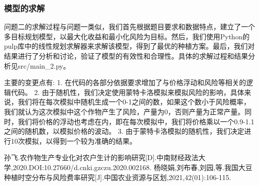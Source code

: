 \documentclass{cumcmthesis}
\begin{document}
\subsubsection{模型的求解}
问题二的求解过程与问题一类似，我们首先根据题目要求和数据特点，建立了一个多目标规划模型，以最大化收益和最小化风险为目标。然后，我们使用Python的pulp库中的线性规划求解器来求解该模型，得到了最优的种植方案。最后，我们对结果进行了分析和讨论，验证了模型的有效性和合理性。具体的求解过程和结果分析见src/main\_2.py。

主要的变更点有:
1. 在代码的各部分依据要求增加了与价格浮动和风险等相关的逻辑代码。
2. 由于随机性，我们决定使用蒙特卡洛模拟来模拟风险的影响，具体来说，我们将在每次模拟中随机生成一个0-1之间的数，如果这个数小于风险概率，我们就认为这次模拟中这个作物产生了风险，产量为0，否则产量为正常产量。同时，我们将价格的浮动也考虑在内，即在每次模拟中，我们将价格乘以一个0.9-1.1之间的随机数，以模拟价格的波动。
3. 由于蒙特卡洛模拟的随机性，我们决定进行10次模拟，以得到一个较为准确的结果。


\begin{thebibliography}{99}  
 孙飞.农作物生产专业化对农户生计的影响研究[D].中南财经政法大学,2020.DOI:10.27660/d.cnki.gzczu.2020.002168.
 杨晓娟,刘布春,刘园,等.我国大豆种植时空分布与风险费率研究[J].中国农业资源与区划,2021,42(01):106-115.

\end{thebibliography}
    
\end{document}
